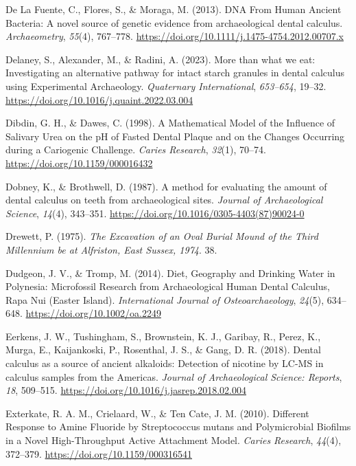 \documentclass[
  b5paper,
]{book}
\newlength{\cslhangindent}
\newenvironment{CSLReferences}[2] %
 {\begin{list}{}{%
  \setlength{\itemindent}{0pt}
  \setlength{\leftmargin}{0pt}
  \setlength{\parsep}{0pt}
  \ifodd #1
   \setlength{\leftmargin}{\cslhangindent}
   \setlength{\itemindent}{-1\cslhangindent}
  \fi
  \setlength{\itemsep}{#2\baselineskip}}}
 {\end{list}}
\begin{document}
\begin{CSLReferences}{1}{0}
De La Fuente, C., Flores, S., \& Moraga, M. (2013). {DNA From Human
Ancient Bacteria}: {A} novel source of genetic evidence from
archaeological dental calculus. \emph{Archaeometry}, \emph{55}(4),
767--778. \url{https://doi.org/10.1111/j.1475-4754.2012.00707.x}

Delaney, S., Alexander, M., \& Radini, A. (2023). More than what we eat:
{Investigating} an alternative pathway for intact starch granules in
dental calculus using {Experimental Archaeology}. \emph{Quaternary
International}, \emph{653--654}, 19--32.
\url{https://doi.org/10.1016/j.quaint.2022.03.004}

Dibdin, G. H., \& Dawes, C. (1998). A {Mathematical Model} of the
{Influence} of {Salivary Urea} on the {pH} of {Fasted Dental Plaque} and
on the {Changes Occurring} during a {Cariogenic Challenge}. \emph{Caries
Research}, \emph{32}(1), 70--74. \url{https://doi.org/10.1159/000016432}

Dobney, K., \& Brothwell, D. (1987). A method for evaluating the amount
of dental calculus on teeth from archaeological sites. \emph{Journal of
Archaeological Science}, \emph{14}(4), 343--351.
\url{https://doi.org/10.1016/0305-4403(87)90024-0}

Drewett, P. (1975). \emph{The {Excavation} of an {Oval Burial Mound} of
the {Third Millennium} be at {Alfriston}, {East Sussex}, 1974}. 38.

Dudgeon, J. V., \& Tromp, M. (2014). Diet, {Geography} and {Drinking
Water} in {Polynesia}: {Microfossil Research} from {Archaeological Human
Dental Calculus}, {Rapa Nui} ({Easter Island}). \emph{International
Journal of Osteoarchaeology}, \emph{24}(5), 634--648.
\url{https://doi.org/10.1002/oa.2249}

Eerkens, J. W., Tushingham, S., Brownstein, K. J., Garibay, R., Perez,
K., Murga, E., Kaijankoski, P., Rosenthal, J. S., \& Gang, D. R. (2018).
Dental calculus as a source of ancient alkaloids: {Detection} of
nicotine by {LC-MS} in calculus samples from the {Americas}.
\emph{Journal of Archaeological Science: Reports}, \emph{18}, 509--515.
\url{https://doi.org/10.1016/j.jasrep.2018.02.004}

Exterkate, R. A. M., Crielaard, W., \& Ten Cate, J. M. (2010). Different
{Response} to {Amine Fluoride} by {Streptococcus} mutans and
{Polymicrobial Biofilms} in a {Novel High-Throughput Active Attachment
Model}. \emph{Caries Research}, \emph{44}(4), 372--379.
\url{https://doi.org/10.1159/000316541}


\end{CSLReferences}
\end{document}
